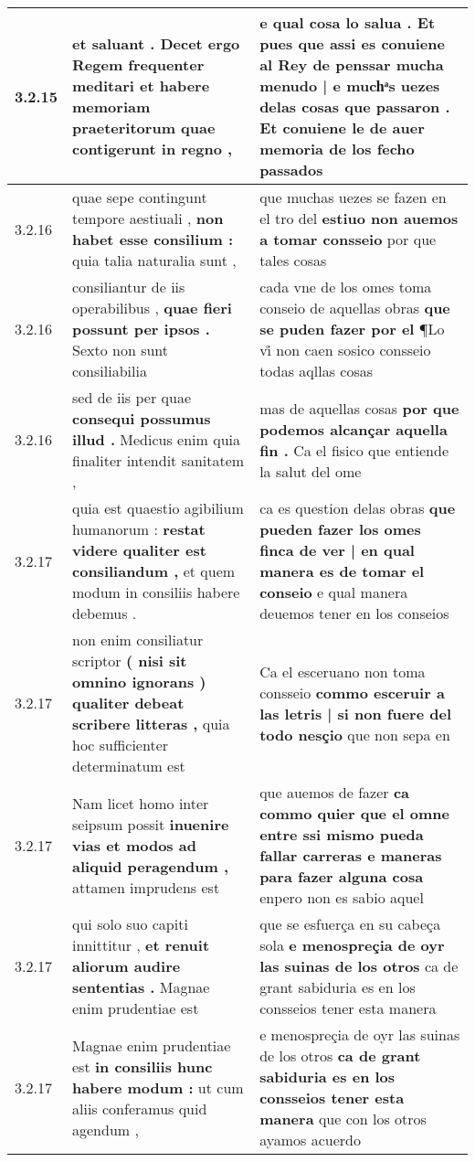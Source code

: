\begin{tabular}{|p{1cm}|p{6.5cm}|p{6.5cm}|}
3.2.15 & et saluant . \textbf{ Decet ergo Regem frequenter meditari et habere memoriam praeteritorum } quae contigerunt in regno , & e qual cosa lo salua . \textbf{ Et pues que assi es conuiene al Rey de penssar mucha menudo | e muchͣs uezes delas cosas que passaron . } Et conuiene le de auer memoria de los fecho passados \\\hline
3.2.16 & quae sepe contingunt tempore aestiuali , \textbf{ non habet esse consilium : } quia talia naturalia sunt , & que muchas uezes se fazen en el tro del \textbf{ estiuo non auemos a tomar consseio } por que tales cosas \\\hline
3.2.16 & consiliantur de iis operabilibus , \textbf{ quae fieri possunt per ipsos . } Sexto non sunt consiliabilia & cada vne de los omes toma conseio de aquellas obras \textbf{ que se puden fazer por el } ¶Lo vi̊ non caen sosico consseio todas aqllas cosas \\\hline
3.2.16 & sed de iis per quae \textbf{ consequi possumus illud . } Medicus enim quia finaliter intendit sanitatem , & mas de aquellas cosas \textbf{ por que podemos alcançar aquella fin . } Ca el fisico que entiende la salut del ome \\\hline
3.2.17 & quia est quaestio agibilium humanorum : \textbf{ restat videre qualiter est consiliandum , } et quem modum in consiliis habere debemus . & ca es question delas obras \textbf{ que pueden fazer los omes finca de ver | en qual manera es de tomar el conseio } e qual manera deuemos tener en los conseios \\\hline
3.2.17 & non enim consiliatur scriptor \textbf{ ( nisi sit omnino ignorans ) qualiter debeat scribere litteras , } quia hoc sufficienter determinatum est & Ca el esceruano non toma consseio \textbf{ commo esceruir a las letris | si non fuere del todo nesçio } que non sepa en \\\hline
3.2.17 & Nam licet homo inter seipsum possit \textbf{ inuenire vias et modos ad aliquid peragendum , } attamen imprudens est & que auemos de fazer \textbf{ ca commo quier que el omne entre ssi mismo pueda fallar carreras e maneras para fazer alguna cosa } enpero non es sabio aquel \\\hline
3.2.17 & qui solo suo capiti innittitur , \textbf{ et renuit aliorum audire sententias . } Magnae enim prudentiae est & que se esfuerça en su cabeça sola \textbf{ e menospreçia de oyr las suinas de los otros } ca de grant sabiduria es en los consseios tener esta manera \\\hline
3.2.17 & Magnae enim prudentiae est \textbf{ in consiliis hunc habere modum : } ut cum aliis conferamus quid agendum , & e menospreçia de oyr las suinas de los otros \textbf{ ca de grant sabiduria es en los consseios tener esta manera } que con los otros ayamos acuerdo \\\hline

\end{tabular}

